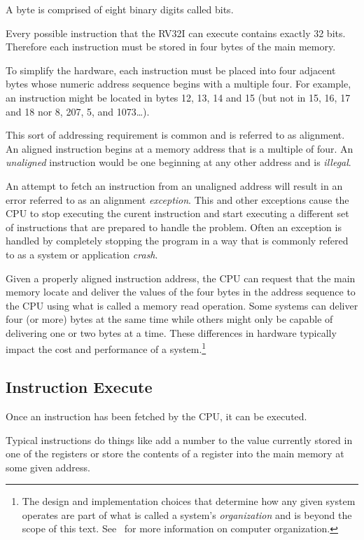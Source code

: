 A byte is comprised of eight binary digits called \gls{bit}s.

Every possible instruction that the RV32I can execute contains
exactly 32 bits.  Therefore each instruction must be stored in 
four bytes of the main memory.

To simplify the hardware, each instruction 
must be placed into four adjacent bytes whose numeric address sequence 
begins with a multiple four.  For example, an instruction might be 
located in bytes 12, 13, 14 and 15 (but not in 15, 16, 17 and 18
nor 8, 207, 5, and 1073\ldots).

This sort of addressing requirement is common and is referred to as 
\gls{alignment}.  An aligned instruction begins at a memory address
that is a multiple of four.  An {\em unaligned} instruction would
be one beginning at any other address and is {\em illegal}.

An attempt to fetch an instruction from an unaligned address
will result in an error referred to as an alignment {\em \gls{exception}}.
This and other exceptions cause the CPU to stop executing the 
curent instruction and start executing a different set of instructions
that are prepared to handle the problem.  Often an exception is 
handled by completely stopping the program in a way that is commonly 
refered to as a system or application {\em crash}.

Given a properly aligned instruction address, the CPU can request 
that the main memory locate and deliver the values of the four bytes
in the address sequence to the CPU using what is called a memory
read operation.  Some systems can deliver four (or more) bytes at the
same time while others might only be capable of delivering one or
two bytes at a time.  These differences in hardware typically impact the 
cost and performance of a system.\footnote{The design and implementation 
choices that determine how any given system operates are part of what is 
called a system's {\em organization} and is beyond the scope of this text.
See~\cite{codriscv:2017} for more information on computer organization.}


\subsection{Instruction Execute}

Once an instruction has been fetched by the CPU, it can be executed.

Typical instructions do things like add a number to the value
currently stored in one of the registers or store the contents of a
register into the main memory at some given address.

